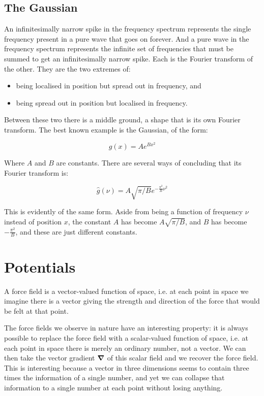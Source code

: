 \subsection{The Gaussian}

An infinitesimally narrow spike in the frequency spectrum represents the single frequency present in a pure wave that goes on forever. And a pure wave in the frequency spectrum represents the infinite set of frequencies that must be summed to get an infinitesimally narrow spike. Each is the Fourier transform of the other. They are the two extremes of:

\begin{itemize}
    \item being localised in position but spread out in frequency, and
    \item being spread out in position but localised in frequency.
\end{itemize}

Between these two there is a middle ground, a shape that is its own Fourier transform. The best known example is the Gaussian, of the form:

$$g(x) = Ae^{Bx^2}$$

Where $A$ and $B$ are constants. There are several ways of concluding that its Fourier transform is:

$$\hat{g}(\nu) = A \sqrt{\pi/B} e^{-\frac{\pi^2}{B} \nu^2}$$

This is evidently of the same form. Aside from being a function of frequency $\nu$ instead of position $x$, the constant $A$ has become $A \sqrt{\pi/B}$, and $B$ has become $-\frac{\pi^2}{B}$, and these are just different constants.

\section{Potentials} \label{sec:potential}

A force field is a vector-valued function of space, i.e. at each point in space we imagine there is a vector giving the strength and direction of the force that would be felt at that point.

The force fields we observe in nature have an interesting property: it is always possible to replace the force field with a scalar-valued function of space, i.e. at each point in space there is merely an ordinary number, not a vector. We can then take the vector gradient $\grad$ of this scalar field and we recover the force field. This is interesting because a vector in three dimensions seems to contain three times the information of a single number, and yet we can collapse that information to a single number at each point without losing anything.

